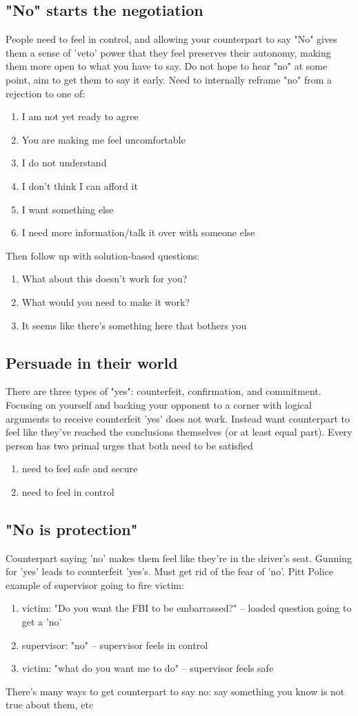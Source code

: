 \documentclass{summary}
\begin{document}
\subsection{"No" starts the negotiation}
People need to feel in control, and allowing your counterpart to say "No" gives them a sense of 'veto' power that they feel preserves their autonomy, making them more open to what you have to say. Do not hope to hear "no" at some point, aim to get them to say it early. Need to internally reframe "no" from a rejection to one of:
\begin{enumerate}
  \item I am not yet ready to agree
  \item You are making me feel uncomfortable
  \item I do not understand
  \item I don't think I can afford it
  \item I want something else
  \item I need more information/talk it over with someone else
\end{enumerate}
Then follow up with solution-based questions:
\begin{enumerate}
  \item What about this doesn't work for you?
  \item What would you need to make it work?
  \item It seems like there's something here that bothers you
\end{enumerate}
\subsection{Persuade in their world}
There are three types of "yes": counterfeit, confirmation, and commitment. Focusing on yourself and backing your opponent to a corner with logical arguments to receive counterfeit 'yes' does not work. Instead want counterpart to feel like they've reached the conclusions themselves (or at least equal part). Every person has two primal urges that both need to be satisfied
\begin{enumerate}
  \item need to feel safe and secure
  \item need to feel in control
\end{enumerate}
\subsection{"No is protection"}
Counterpart saying 'no' makes them feel like they're in the driver's seat. Gunning for 'yes' leads to counterfeit 'yes's. Must get rid of the fear of 'no'. Pitt Police example of supervisor going to fire victim:
\begin{enumerate}
  \item victim: "Do you want the FBI to be embarrassed?" -- loaded question going to get a 'no'
  \item supervisor: "no" -- supervisor feels in control
  \item victim: "what do you want me to do" -- supervisor feels safe
\end{enumerate}
There's many ways to get counterpart to say no: say something you know is not true about them, etc
\end{document}
